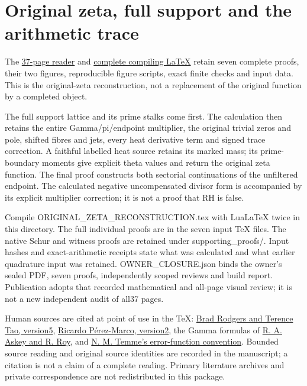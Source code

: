 \documentclass[
]{article}
\author{}
\date{}
\begin{document}
\section{Original zeta, full support and the arithmetic
trace}\label{original-zeta-full-support-and-the-arithmetic-trace}

The
\href{https://github.com/KokunoYumeto/zeta-function-research-reader/blob/main/workbenches/splitzero-tandem/continuations/20260923-retained-source-readers/original-zeta-full-support/ORIGINAL_ZETA_RECONSTRUCTION.pdf}{37-page
reader} and
\href{https://github.com/KokunoYumeto/zeta-function-research-reader/blob/main/workbenches/splitzero-tandem/continuations/20260923-retained-source-readers/original-zeta-full-support/ORIGINAL_ZETA_RECONSTRUCTION.tex}{complete
compiling LaTeX} retain seven complete proofs, their two figures,
reproducible figure scripts, exact finite checks and input data. This is
the original-zeta reconstruction, not a replacement of the original
function by a completed object.

The full support lattice and its prime stalks come first. The
calculation then retains the entire Gamma/pi/endpoint multiplier, the
original trivial zeros and pole, shifted fibres and jets, every heat
derivative term and signed trace correction. A faithful labelled heat
source retains its marked mass; its prime-boundary moments give explicit
theta values and return the original zeta function. The final proof
constructs both sectorial continuations of the unfiltered endpoint. The
calculated negative uncompensated divisor form is accompanied by its
explicit multiplier correction; it is not a proof that RH is false.

Compile ORIGINAL\_ZETA\_RECONSTRUCTION.tex with LuaLaTeX twice in this
directory. The full individual proofs are in the seven input TeX files.
The native Schur and witness proofs are retained under
supporting\_proofs/. Input hashes and exact-arithmetic receipts state
what was calculated and what earlier quadrature input was retained.
OWNER\_CLOSURE.json binds the owner's sealed PDF, seven proofs,
independently scoped reviews and build report. Publication adopts that
recorded mathematical and all-page visual review; it is not a new
independent audit of all37 pages.

Human sources are cited at point of use in the TeX:
\href{https://arxiv.org/abs/1801.05914v5}{Brad Rodgers and Terence Tao,
version5}, \href{https://arxiv.org/abs/2001.04445v2}{Ricardo
Pérez-Marco, version2}, the Gamma formulas of
\href{https://dlmf.nist.gov/5}{R. A. Askey and R. Roy}, and
\href{https://dlmf.nist.gov/7.2.E2}{N. M. Temme's error-function
convention}. Bounded source reading and original source identities are
recorded in the manuscript; a citation is not a claim of a complete
reading. Primary literature archives and private correspondence are not
redistributed in this package.
\end{document}

